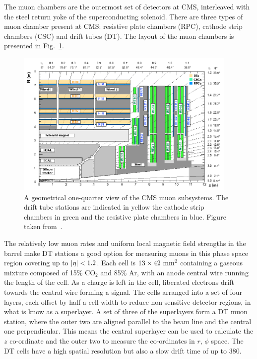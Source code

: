 The muon chambers are the outermost set of detectors at CMS, interleaved with the steel return yoke of the superconducting solenoid.
There are three types of muon chamber present at CMS: resistive plate chambers (RPC), cathode strip chambers (CSC) and drift tubes (DT).
The layout of the muon chambers is presented in Fig.~\ref{fig:CMSMuon}.
\begin{figure}[htpb]
	\centering
	\includegraphics[width=0.95\textwidth]{Figures/CMSMUON}
	\caption[A geometrical one-quarter view of the CMS muon subsystems. The drift tube stations are indicated in yellow the cathode strip chambers in green and the resistive plate chambers in blue.]{A geometrical one-quarter view of the CMS muon subsystems. The drift tube stations are indicated in yellow the cathode strip chambers in green and the resistive plate chambers in blue. Figure taken from~\cite{CMSMuon}.}
	\label{fig:CMSMuon}
\end{figure}

The relatively low muon rates and uniform local magnetic field strengths in the barrel make DT stations a good option for measuring muons in this phase space region covering up to $\lvert \eta \rvert<1.2$.
Each cell is $13\times42\mathrm{~mm}^{2}$ containing a gaseous mixture composed of 15\% $\mathrm{CO}_{2}$ and 85\% $\mathrm{Ar}$, with an anode central wire running the length of the cell.
As a charge is left in the cell, liberated electrons drift towards the central wire forming a signal.
The cells arranged into a set of four layers, each offset by half a cell-width to reduce non-sensitive detector regions, in what is know as a superlayer.
A set of three of the superlayers form a DT muon station, where the outer two are aligned parallel to the beam line and the central one perpendicular.
This means the central superlayer can be used to calculate the $z$ co-ordinate and the outer two to measure the co-ordinates in $r,\,\phi$ space.
The DT cells have a high spatial resolution but also a slow drift time of up to 380\ns{}.

